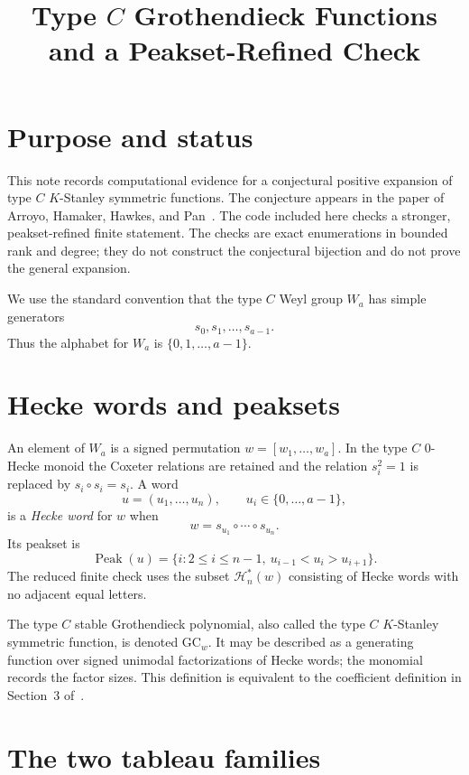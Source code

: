 \documentclass{article}
\title{Type \(C\) Grothendieck Functions and a Peakset-Refined Check}
\author{}
\date{}
\newcommand{\Peak}{\operatorname{Peak}}
\newcommand{\GC}{\mathrm{GC}}
\begin{document}
\maketitle

\section{Purpose and status}

This note records computational evidence for a conjectural positive expansion
of type \(C\) \(K\)-Stanley symmetric functions.  The conjecture appears in
the paper of Arroyo, Hamaker, Hawkes, and Pan~\cite{AHHP}.  The code included
here checks a stronger, peakset-refined finite statement.  The checks are
exact enumerations in bounded rank and degree; they do not construct the
conjectural bijection and do not prove the general expansion.

We use the standard convention that the type \(C\) Weyl group \(W_a\) has
simple generators
\[
  s_0,s_1,\ldots,s_{a-1}.
\]
Thus the alphabet for \(W_a\) is \(\{0,1,\ldots,a-1\}\).

\section{Hecke words and peaksets}

An element of \(W_a\) is a signed permutation
\(w=[w_1,\ldots,w_a]\).  In the type \(C\) \(0\)-Hecke monoid the Coxeter
relations are retained and the relation \(s_i^2=1\) is replaced by
\(s_i\circ s_i=s_i\).  A word
\[
  u=(u_1,\ldots,u_n),\qquad u_i\in\{0,\ldots,a-1\},
\]
is a \emph{Hecke word} for \(w\) when
\[
  w=s_{u_1}\circ\cdots\circ s_{u_n}.
\]
Its peakset is
\[
  \Peak(u)=\{i:2\le i\le n-1,\ u_{i-1}<u_i>u_{i+1}\}.
\]
The reduced finite check uses the subset \(\mathcal H_n^*(w)\) consisting of
Hecke words with no adjacent equal letters.

The type \(C\) stable Grothendieck polynomial, also called the type \(C\)
\(K\)-Stanley symmetric function, is denoted \(\GC_w\).  It may be described
as a generating function over signed unimodal factorizations of Hecke words;
the monomial records the factor sizes.  This definition is equivalent to the
coefficient definition in Section~3 of~\cite{AHHP}.

\section{The two tableau families}
\end{document}
